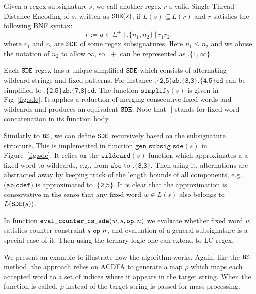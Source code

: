 \begin{definition} \label{deff:std} Given a regex subsignature $s$,
we call another regex $r$ a valid Single Thread Distance Encoding
of $s$, written as $\texttt{SDE}(s)$, if $L(s) \subseteq L(r)$ and $r$
satisfies the following BNF syntax: 
\[
r := a \in \Sigma^+ ~|~ .\{n_1, n_2\} ~|~ r_1 r_2,
\]
where $r_1$ and $r_2$ are $\texttt{SDE}$ of some regex subsignatures.
Here $n_1 \leq n_2$ and we abuse the notation of $n_2$
to allow $\infty$, so $.+$ can be represented as
$.\{1,\infty\}$.
\end{definition}

Each $\texttt{SDE}$ regex has a unique simplified
$\texttt{SDE}$ which consists of alternating wildcard strings and
fixed patterns. For instance $\texttt{.\{2,5\}ab.\{3,3\}.\{4,5\}cd}$
can be simplified to $\texttt{.\{2,5\}ab.\{7,8\}cd}$.
The function $\texttt{simplify}(s)$ is given in Fig\ \ref{fig:sde}.
It applies a reduction of merging consecutive fixed words and
wildcards and produces an equivalent $\texttt{SDE}$. Note that 
$||$ stands for fixed word concatenation in its function body.

Similarly to $\texttt{BS}$, we can define $\texttt{SDE}$ recursively
based on the subsignature structure. 
This is implemented in function $\texttt{gen\_subsig\_sde}(s)$ in
Figure\ \ref{fig:sde}. It relies on the $\texttt{wildcard}(s)$
function which approximates a 
a fixed word to wildcards, e.g.,
from $\texttt{abc}$ to $\texttt{.\{3,3\}}$.
Then using it, alternations are abstracted away
by keeping track of the length bounds of all components,
e.g.,
$\texttt{(ab|cdef)}$ is approximated to
$\texttt{.\{2,5\}}$. It is clear that the
approximation is conservative in the sense that
any fixed word $w \in L(s)$ also belongs to $L(\texttt{SDE}(s))$.

In function $\texttt{eval\_counter\_cs\_sde}(w, s, \texttt{op}, n)$
we evaluate whether fixed word $w$ satisfies counter
constraint $s~\texttt{op}~n$, and evaluation of a general subsignature
is a special case of it. Then using the ternary logic
one can extend to LC-regex.

We present an example to illustrate how the algorithm works.
Again, like the $\texttt{BS}$ method, the approach relies on
ACDFA to generate a map $\rho$ which maps each accepted
word to a set of indices where it appears in the target string.
When the function is called, $\rho$ instead of
the target string is passed for mass processing. 

